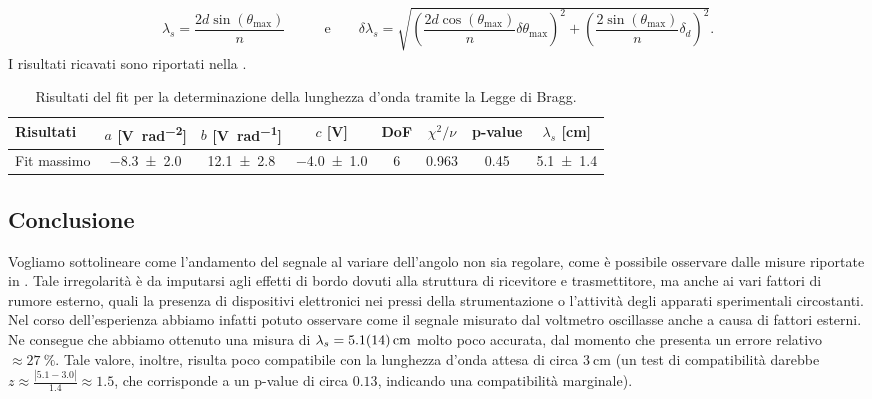 \documentclass[a4paper]{article}
\begin{document}
\begin{align}
  \lambda_s = \dfrac{2d \sin(\theta_{\text{max}})}{n} \qquad & \text{e}\qquad
  \delta \lambda_s = \sqrt{\left( \dfrac{2d \cos(\theta_{\text{max}})}{n}\delta \theta_{\text{max}}\right)^2 + \left(\dfrac{2\sin(\theta_{\text{max}})}{n}\delta_d\right)^2}. \label{eq:lunghezza_bragg}
\end{align}
I risultati ricavati sono riportati nella .
\begin{table}[htbp]
\centering
\caption{Risultati del fit per la determinazione della lunghezza d'onda tramite la Legge di Bragg.}
\label{tab:fit_bragg}
\begin{tabular}{|l|ccccccc|}
\hline
Risultati & $a$ [\si{\volt\per\radian\squared}]& $b$ [\si{\volt\per\radian}]& $c$ [\si{\volt}]& DoF & $\chi^2/\nu$ & p-value & $\lambda_s$ [\si{\centi\metre}]  \\\hline\hline
Fit massimo & \num{-8.3 \pm 2.0} & \num{12.1 \pm 2.8} & \num{-4.0 \pm 1.0} & 6 & 0.963 & 0.45 & \num{5.1 \pm 1.4}\\\hline
\end{tabular}
\end{table}

\subsection{Conclusione}
Vogliamo sottolineare come l'andamento del segnale al variare dell'angolo non sia regolare, come è possibile osservare dalle misure riportate in . Tale irregolarità è da imputarsi agli effetti di bordo dovuti alla struttura di ricevitore e trasmettitore, ma anche ai vari fattori di rumore esterno, quali la presenza di dispositivi elettronici nei pressi della strumentazione o l'attività degli apparati sperimentali circostanti. Nel corso dell'esperienza abbiamo infatti potuto osservare come il segnale misurato dal voltmetro oscillasse anche a causa di fattori esterni. Ne consegue che abbiamo ottenuto una misura di $\lambda_s = \SI{5.1 \pm 1.4}{\centi\metre}$ molto poco accurata, dal momento che presenta un errore relativo $\approx \SI{27}{\percent}$. Tale valore, inoltre, risulta poco compatibile con la lunghezza d'onda attesa di circa $\SI{3}{\centi\metre}$ (un test di compatibilità darebbe $z \approx \frac{|5.1-3.0|}{1.4} \approx 1.5$, che corrisponde a un p-value di circa $0.13$, indicando una compatibilità marginale).
\end{document}
